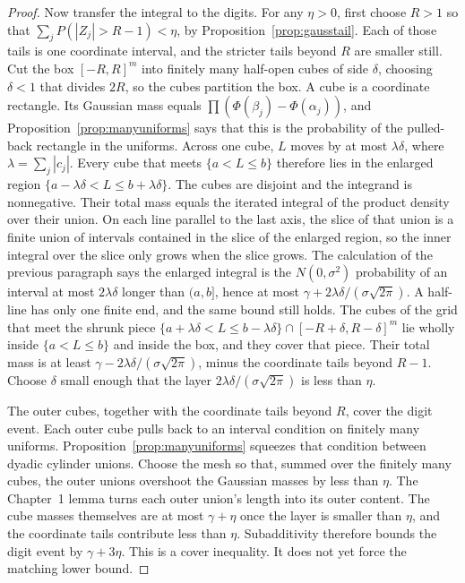 \begin{proof}
Now transfer the integral to the digits. For any $\eta>0$, first choose $R>1$ so that $\sum_j P(|Z_j|>R-1)<\eta$, by Proposition~\ref{prop:gausstail}. Each of those tails is one coordinate interval, and the stricter tails beyond $R$ are smaller still. Cut the box $[-R,R]^m$ into finitely many half-open cubes of side $\delta$, choosing $\delta<1$ that divides $2R$, so the cubes partition the box. A cube is a coordinate rectangle. Its Gaussian mass equals $\prod(\Phi(\beta_j)-\Phi(\alpha_j))$, and Proposition~\ref{prop:manyuniforms} says that this is the probability of the pulled-back rectangle in the uniforms. Across one cube, $L$ moves by at most $\lambda\delta$, where $\lambda=\sum_j|c_j|$. Every cube that meets $\{a<L\le b\}$ therefore lies in the enlarged region $\{a-\lambda\delta<L\le b+\lambda\delta\}$. The cubes are disjoint and the integrand is nonnegative. Their total mass equals the iterated integral of the product density over their union. On each line parallel to the last axis, the slice of that union is a finite union of intervals contained in the slice of the enlarged region, so the inner integral over the slice only grows when the slice grows. The calculation of the previous paragraph says the enlarged integral is the $N(0,\sigma^2)$ probability of an interval at most $2\lambda\delta$ longer than $(a,b]$, hence at most $\gamma+2\lambda\delta/(\sigma\sqrt{2\pi})$. A half-line has only one finite end, and the same bound still holds. The cubes of the grid that meet the shrunk piece $\{a+\lambda\delta<L\le b-\lambda\delta\}\cap[-R+\delta,R-\delta]^m$ lie wholly inside $\{a<L\le b\}$ and inside the box, and they cover that piece. Their total mass is at least $\gamma-2\lambda\delta/(\sigma\sqrt{2\pi})$, minus the coordinate tails beyond $R-1$. Choose $\delta$ small enough that the layer $2\lambda\delta/(\sigma\sqrt{2\pi})$ is less than $\eta$.

The outer cubes, together with the coordinate tails beyond $R$, cover the digit event. Each outer cube pulls back to an interval condition on finitely many uniforms. Proposition~\ref{prop:manyuniforms} squeezes that condition between dyadic cylinder unions. Choose the mesh so that, summed over the finitely many cubes, the outer unions overshoot the Gaussian masses by less than $\eta$. The Chapter~1 lemma turns each outer union's length into its outer content. The cube masses themselves are at most $\gamma+\eta$ once the layer is smaller than $\eta$, and the coordinate tails contribute less than $\eta$. Subadditivity therefore bounds the digit event by $\gamma+3\eta$. This is a cover inequality. It does not yet force the matching lower bound.


\end{proof}
